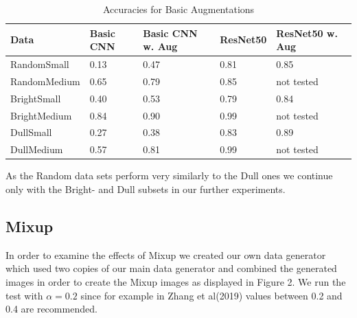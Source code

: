 \documentclass{article}
\begin{document}
\begin{table}[H]
	\caption{Accuracies for Basic Augmentations }
	\label{sample-table}
	\centering
	\begin{tabular}{lllll}
		\toprule
		Data &  Basic CNN & Basic CNN w. Aug & ResNet50 & ResNet50 w. Aug\\
		\midrule
		RandomSmall  & 0.13 & 0.47 & 0.81 & 0.85 \\
		RandomMedium & 0.65 & 0.79 & 0.85 & not tested     \\
		BrightSmall  & 0.40 & 0.53 & 0.79 & 0.84 \\
		BrightMedium & 0.84 & 0.90 & 0.99 & not tested     \\
		DullSmall    & 0.27 & 0.38 & 0.83 & 0.89 \\
		DullMedium   & 0.57 & 0.81 & 0.99 & not tested     \\
		\bottomrule
	\end{tabular}
\end{table}





As the Random data sets perform very similarly to the Dull ones we continue only with the Bright- and Dull subsets in our further experiments.

\subsection{Mixup}

In order to examine the effects of Mixup we created our own data generator which used two copies of our main data generator and combined the generated images in order to create the Mixup images as displayed in Figure 2. We run the test with $\alpha=0.2$ since for example in Zhang et al(2019) values between 0.2 and 0.4 are recommended.
\end{document}
